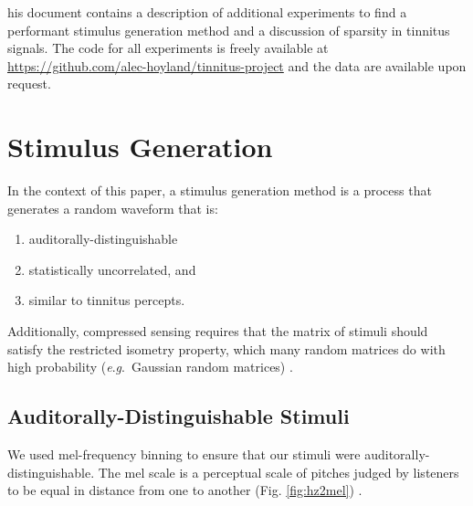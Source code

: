 \documentclass[journal]{IEEEtran}
\newcommand{\eg}{\textit{e}.\textit{g}.\ }
\begin{document}


	






his document contains a description of additional experiments to find a performant
stimulus generation method and a discussion of sparsity in tinnitus signals.
The code for all experiments is freely available at \url{https://github.com/alec-hoyland/tinnitus-project}
and the data are available upon request.

\section{Stimulus Generation}

In the context of this paper, a stimulus generation method
is a process that generates a random waveform that is:

\begin{enumerate}
  \item auditorally-distinguishable
  \item statistically uncorrelated, and
  \item similar to tinnitus percepts.
\end{enumerate}

Additionally, compressed sensing requires that the matrix of stimuli
should satisfy the restricted isometry property,
which many random matrices do with high probability (\eg Gaussian random matrices)
\cite{candesRestrictedIsometryProperty2008,candesIntroductionCompressiveSampling2008}.

\subsection{Auditorally-Distinguishable Stimuli}

We used mel-frequency binning to ensure that our stimuli were auditorally-distinguishable.
The mel scale is a perceptual scale of pitches judged by listeners to be equal in distance
from one to another (Fig. \ref{fig:hz2mel}) \cite{hamiltonTopographySpeechrelatedAcoustic2020}.
\end{document}
